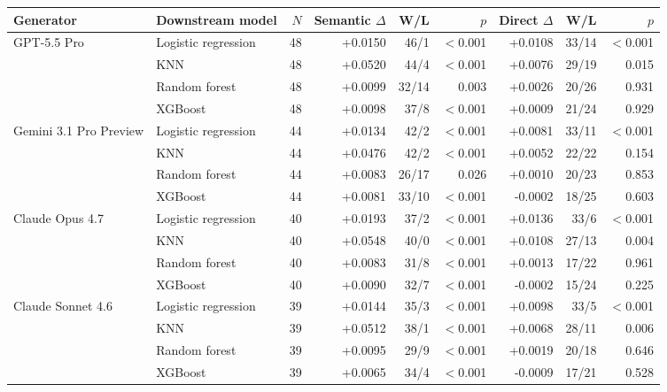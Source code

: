 \begin{tabular}{llrrrrrrr}
\toprule
Generator & Downstream model & $N$ & Semantic $\Delta$ & W/L & $p$ & Direct $\Delta$ & W/L & $p$ \\
\midrule
GPT-5.5 Pro & Logistic regression & 48 & +0.0150 & 46/1 & $<$0.001 & +0.0108 & 33/14 & $<$0.001 \\
 & KNN & 48 & +0.0520 & 44/4 & $<$0.001 & +0.0076 & 29/19 & 0.015 \\
 & Random forest & 48 & +0.0099 & 32/14 & 0.003 & +0.0026 & 20/26 & 0.931 \\
 & XGBoost & 48 & +0.0098 & 37/8 & $<$0.001 & +0.0009 & 21/24 & 0.929 \\
\midrule
Gemini 3.1 Pro Preview & Logistic regression & 44 & +0.0134 & 42/2 & $<$0.001 & +0.0081 & 33/11 & $<$0.001 \\
 & KNN & 44 & +0.0476 & 42/2 & $<$0.001 & +0.0052 & 22/22 & 0.154 \\
 & Random forest & 44 & +0.0083 & 26/17 & 0.026 & +0.0010 & 20/23 & 0.853 \\
 & XGBoost & 44 & +0.0081 & 33/10 & $<$0.001 & -0.0002 & 18/25 & 0.603 \\
\midrule
Claude Opus 4.7 & Logistic regression & 40 & +0.0193 & 37/2 & $<$0.001 & +0.0136 & 33/6 & $<$0.001 \\
 & KNN & 40 & +0.0548 & 40/0 & $<$0.001 & +0.0108 & 27/13 & 0.004 \\
 & Random forest & 40 & +0.0083 & 31/8 & $<$0.001 & +0.0013 & 17/22 & 0.961 \\
 & XGBoost & 40 & +0.0090 & 32/7 & $<$0.001 & -0.0002 & 15/24 & 0.225 \\
\midrule
Claude Sonnet 4.6 & Logistic regression & 39 & +0.0144 & 35/3 & $<$0.001 & +0.0098 & 33/5 & $<$0.001 \\
 & KNN & 39 & +0.0512 & 38/1 & $<$0.001 & +0.0068 & 28/11 & 0.006 \\
 & Random forest & 39 & +0.0095 & 29/9 & $<$0.001 & +0.0019 & 20/18 & 0.646 \\
 & XGBoost & 39 & +0.0065 & 34/4 & $<$0.001 & -0.0009 & 17/21 & 0.528 \\
\bottomrule
\end{tabular}
